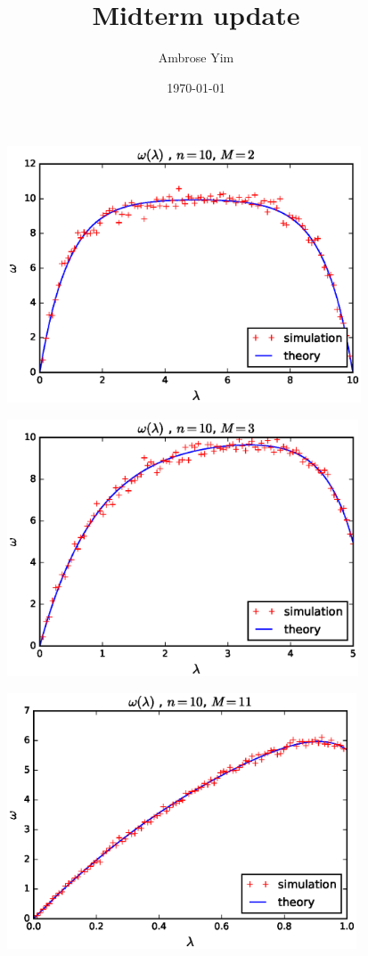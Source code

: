 \documentclass[10pt]{beamer}
\title{Midterm update}
\date{\today}
\author{Ambrose Yim}
\begin{document}
\begin{frame}
\begin{figure}[b]
\centering
\includegraphics[height=3in]{wl_n10_m2}
\end{figure}
\end{frame}

\begin{frame}
\begin{figure}[b]
\centering
\includegraphics[height=3in]{wl_n10_m3}
\end{figure}
\end{frame}

\begin{frame}
\begin{figure}[b]
\centering
\includegraphics[height=3in]{wl_n10_m11}
\end{figure}
\end{frame}
\end{document}
